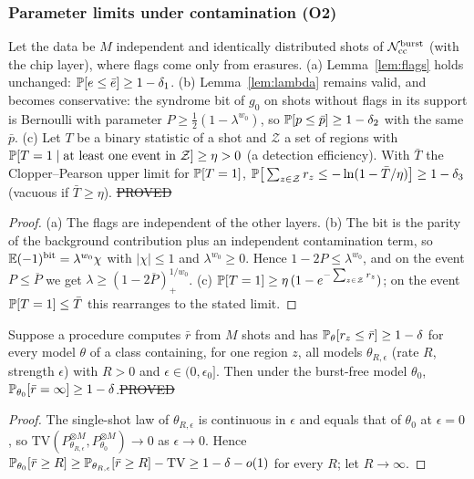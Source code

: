\subsubsection*{Parameter limits under contamination (O2)}

\begin{lemma}\label{lem:robust}
Let the data be $M$ independent and identically distributed shots of $\mathcal{N}_{\rm cc}^{\rm burst}$ (with the chip layer), where flags come only from erasures.
(a) Lemma~\ref{lem:flags} holds unchanged: $\mathbb{P}[e\le\bar e]\ge1-\delta_1$.
(b) Lemma~\ref{lem:lambda} remains valid, and becomes conservative: the syndrome bit of $g_0$ on shots without flags in its support is Bernoulli with parameter $P\ge\tfrac12(1-\lambda^{w_0})$, so $\mathbb{P}[p\le\bar p]\ge1-\delta_2$ with the same $\bar p$.
(c) Let $T$ be a binary statistic of a shot and $\mathcal Z$ a set of regions with $\mathbb{P}[T=1\mid\text{at least one event in }\mathcal Z]\ge\eta>0$ (a detection efficiency). With $\bar T$ the Clopper--Pearson upper limit for $\mathbb{P}[T=1]$, $\mathbb{P}\big[\sum_{z\in\mathcal Z}r_z\le-\ln(1-\bar T/\eta)\big]\ge1-\delta_3$ (vacuous if $\bar T\ge\eta$).
\hfill\st{PROVED}
\end{lemma}
\begin{proof}
(a) The flags are independent of the other layers. (b) The bit is the parity of the background contribution plus an independent contamination term, so $\mathbb{E}(-1)^{\rm bit}=\lambda^{w_0}\chi$ with $|\chi|\le1$ and $\lambda^{w_0}\ge0$. Hence $1-2P\le\lambda^{w_0}$, and on the event $P\le\overline P$ we get $\lambda\ge(1-2\overline P)_+^{1/w_0}$. (c) $\mathbb{P}[T=1]\ge\eta\,(1-e^{-\sum_{z\in\mathcal Z}r_z})$; on the event $\mathbb{P}[T=1]\le\bar T$ this rearranges to the stated limit.
\end{proof}

\begin{proposition}\label{prop:no-rate-limit}
Suppose a procedure computes $\bar r$ from $M$ shots and has $\mathbb{P}_\theta[r_z\le\bar r]\ge1-\delta$ for every model $\theta$ of a class containing, for one region $z$, all models $\theta_{R,\epsilon}$ (rate $R$, strength $\epsilon$) with $R>0$ and $\epsilon\in(0,\epsilon_0]$. Then under the burst-free model $\theta_0$, $\mathbb{P}_{\theta_0}[\bar r=\infty]\ge1-\delta$.\hfill\st{PROVED}
\end{proposition}
\begin{proof}
The single-shot law of $\theta_{R,\epsilon}$ is continuous in $\epsilon$ and equals that of $\theta_0$ at $\epsilon=0$, so $\mathrm{TV}(P^{\otimes M}_{\theta_{R,\epsilon}},P^{\otimes M}_{\theta_0})\to0$ as $\epsilon\to0$. Hence $\mathbb{P}_{\theta_0}[\bar r\ge R]\ge\mathbb{P}_{\theta_{R,\epsilon}}[\bar r\ge R]-\mathrm{TV}\ge1-\delta-o(1)$ for every $R$; let $R\to\infty$.
\end{proof}

